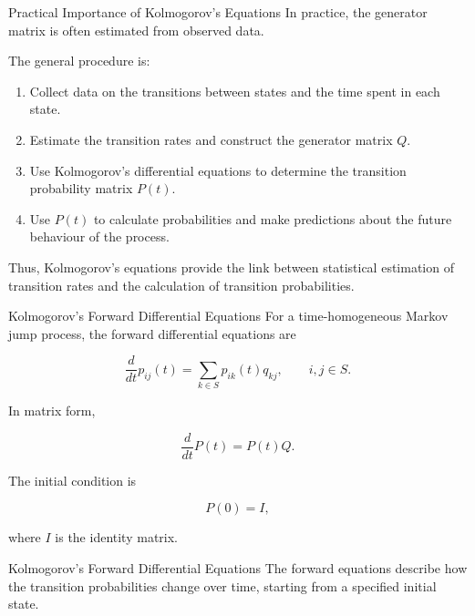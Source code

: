 \documentclass[
  ignorenonframetext,
  aspectratio=169,
]{beamer}
\providecommand{\tightlist}{%
  \setlength{\itemsep}{0pt}\setlength{\parskip}{0pt}}
\begin{document}
\begin{frame}{Practical Importance of Kolmogorov's Equations}
\protect{}\label{practical-importance-of-kolmogorovs-equations}
In practice, the generator matrix is often estimated from observed data.

The general procedure is:

\begin{enumerate}
\tightlist
\item
  Collect data on the transitions between states and the time spent in
  each state.
\item
  Estimate the transition rates and construct the generator matrix
  \(Q\).
\item
  Use Kolmogorov's differential equations to determine the transition
  probability matrix \(P(t)\).
\item
  Use \(P(t)\) to calculate probabilities and make predictions about the
  future behaviour of the process.
\end{enumerate}

Thus, Kolmogorov's equations provide the link between statistical
estimation of transition rates and the calculation of transition
probabilities.
\end{frame}

\begin{frame}{Kolmogorov's Forward Differential Equations}
\protect{}\label{kolmogorovs-forward-differential-equations}
For a time-homogeneous Markov jump process, the forward differential
equations are

\[
\boxed{
\frac{d}{dt}p_{ij}(t)
=
\sum_{k\in S}p_{ik}(t)q_{kj},
\qquad i,j\in S.
}
\]

In matrix form,

\[
\boxed{
\frac{d}{dt}P(t)=P(t)Q.
}
\]

The initial condition is

\[
P(0)=I,
\]

where \(I\) is the identity matrix.
\end{frame}

\begin{frame}{Kolmogorov's Forward Differential Equations}
\protect{}\label{kolmogorovs-forward-differential-equations-1}
The forward equations describe how the transition probabilities change
over time, starting from a specified initial state.
\end{frame}
\end{document}
